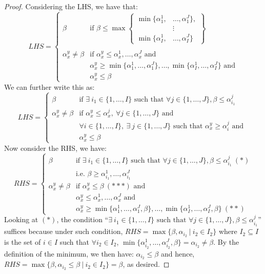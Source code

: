 \documentclass{article} %
\begin{document}
\begin{proof}
Considering the LHS, we have that:
\[
LHS=
\begin{cases}
\beta & \textrm{if } \beta\leq
\max\left\{
      \begin{aligned}
        \min\{\alpha_1^1,&\ldots,\alpha_1^J\}, \\
        &\vdots \\
        \min\{\alpha_I^1,&\ldots,\alpha_I^J\}
      \end{aligned}
    \right\} \\
    \\
\alpha_x^y\not=\beta &\textrm {if } \alpha_x^y\leq\alpha_x^1,\ldots,\alpha_x^J \textrm{ and} \\
& \alpha_x^y\geq \min\{\alpha_1^1,\ldots,\alpha_1^J\},\ldots,\min\{\alpha_I^1,\ldots,\alpha_I^J\} \textrm { and}\\
& \alpha_x^y\leq \beta
\end{cases}
\]
We can further write this as:
\[
LHS=
\begin{cases}
\beta & \textrm{if }\exists\ i_1\in\{1,\ldots,I\} \textrm{ such that }\forall j\in\{1,\ldots,J\}, \beta\leq\alpha_{i_1}^j \\
\alpha_x^y\not=\beta & \textrm{if } \alpha_x^y\leq\alpha_x^j,\ \forall j\in\{1,\ldots,J\} \textrm{ and} \\
& \forall i\in\{1,\ldots,I\},\ \exists\ j\in\{1,\ldots,J\} \textrm{ such that } \alpha_x^y\geq\alpha_i^j \textrm{ and } \\
& \alpha_x^y\leq \beta
\end{cases}
\]
Now consider the RHS, we have:
\[
RHS = 
\begin{cases}
\beta & \textrm{if }\exists\ i_1\in\{1,\ldots,I\} \textrm{ such that }\forall j\in\{1,\ldots,J\}, \beta\leq\alpha_{i_1}^j\ (*) \\
& \textrm{i.e. } \beta\geq\alpha_{i_1}^1,\ldots,\alpha_{i_1}^J\\
\alpha_x^y\not=\beta &\textrm{if }\alpha_x^y\leq\beta\ (***) \textrm{ and}\\
& \alpha_x^y\leq\alpha_x^1,\ldots,\alpha_x^J \textrm{ and}\\
& \alpha_x^y\geq \min\{\alpha_1^1,\ldots,\alpha_1^J,\beta\},\ldots,\min\{\alpha_I^1,\ldots,\alpha_I^J,\beta\}\ (**)
\end{cases}
\]
Looking at $(*)$, the condition ``$\exists\ i_1\in\{1,\ldots,I\} \textrm{ such that }\forall j\in\{1,\ldots,J\}, \beta\leq\alpha_{i_1}^j$'' suffices because under such condition, $RHS=\max\{\beta, \alpha_{i_2}\ |\ i_2\in I_2\}$ where $I_2\subseteq I$ is the set of $i\in I$ such that $\forall i_2\in I_2$, $\min\{\alpha_{i_2}^1,\ldots,\alpha_{i_2}^J,\beta\}=\alpha_{i_2}\not=\beta$. By the definition of the minimum, we then have: $\alpha_{i_2}\leq\beta$ and hence, $RHS=\max\{\beta, \alpha_{i_2}\leq\beta\ |\ i_2\in I_2\}=\beta$, as desired.


\end{proof}
\end{document}
